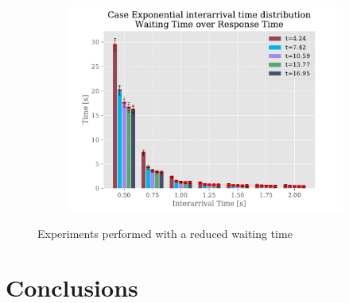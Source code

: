 \documentclass[a4paper,12pt]{article}
\begin{document}
\begin{figure}
\begin{subfigure}[b]{.3\textwidth}
    \includegraphics[width=\textwidth]{img/WaitingTimeOverResponseTimeP1Exp.pdf}
  \end{subfigure}
  \caption{Experiments performed with a reduced waiting time}
  \label{fig:result-2}
\end{figure}

\section{Conclusions}
\end{document}
